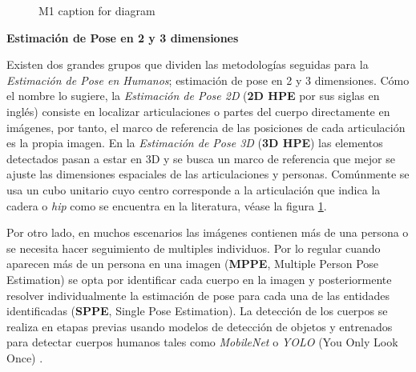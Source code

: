 \begin{figure}
\begin{center}
\caption{M1 caption for diagram} \label{fig:HPE-diagram}
\end{center} \end{figure}

\textbf{Estimación de Pose en 2 y 3 dimensiones}

Existen dos grandes grupos que dividen las metodologías seguidas para la \textit{Estimación de Pose en
Humanos}; estimación de pose en 2 y 3 dimensiones. Cómo el nombre lo sugiere, la \textit{Estimación
de Pose 2D} (\textbf{2D HPE} por sus siglas en inglés) consiste en localizar articulaciones o partes del cuerpo
directamente en imágenes, por tanto, el marco de referencia de las posiciones de cada articulación es la
propia imagen. En la \textit{Estimación de Pose 3D} (\textbf{3D HPE}) las elementos detectados pasan a estar en 3D
y se busca un marco de referencia que mejor se ajuste las dimensiones espaciales de las
articulaciones y personas. Comúnmente se usa un cubo unitario cuyo centro corresponde a la
articulación que indica la cadera o \textit{hip} como se encuentra en la literatura, véase la figura
\ref{fig:HPE-diagram}.

Por otro lado, en muchos escenarios las imágenes contienen más de una persona o se necesita hacer seguimiento
de multiples individuos. Por lo regular cuando aparecen más de un persona en una imagen
(\textbf{MPPE}, Multiple Person Pose Estimation)
se opta por identificar cada cuerpo en la imagen y posteriormente resolver individualmente
la estimación de pose para cada una de las entidades identificadas (\textbf{SPPE}, Single Pose Estimation).
La detección de los cuerpos se realiza en
etapas previas usando modelos de detección de objetos y entrenados para detectar cuerpos
humanos tales como \textit{MobileNet} \cite{DBLP:journals/corr/RenHG015}
\cite{DBLP:journals/corr/HowardZCKWWAA17} \cite{DBLP:journals/corr/abs-1801-04381} o \textit{YOLO}
(You Only Look Once) \cite{DBLP:journals/corr/RedmonDGF15} \cite{DBLP:journals/corr/abs-2004-10934}.

